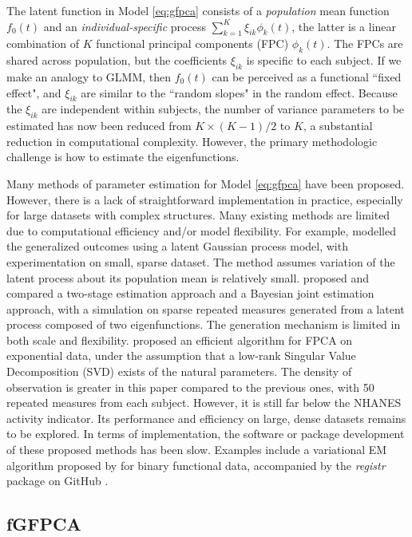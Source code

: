 \documentclass[12pt]{article}
\begin{document}
The latent function in Model \ref{eq:gfpca} consists of a
\textit{population} mean function $f_0(t)$ and an \textit{individual-specific} process $\sum_{k=1}^{K}\xi_{ik}\phi_k(t)$, the latter is a linear combination of $K$ functional principal components (FPC) $\phi_k(t)$. The FPCs are shared across population, but the coefficients $\xi_{ik}$ is specific to each subject. If we make an analogy to GLMM, then $f_0(t)$ can be perceived as a functional ``fixed effect", and $\xi_{ik}$ are similar to the ``random slopes" in the random effect. Because the $\xi_{ik}$ are independent within subjects, the number of variance parameters to be estimated has now been reduced from $K \times (K-1)/2$ to $K$, a substantial reduction in computational complexity. However, the primary methodologic challenge is how to estimate the eigenfunctions.


Many methods of parameter estimation for Model \ref{eq:gfpca}  have been proposed. However, there is a lack of straightforward implementation in practice, especially for large datasets with complex structures. Many existing methods are limited due to computational efficiency and/or model flexibility. For example, \citet{hall2018} modelled the generalized outcomes using a latent Gaussian process model, with experimentation on small, sparse dataset. The method assumes variation of the latent process about its population mean is relatively small. 
\citet{gertheiss2017} proposed and compared a two-stage estimation approach and a Bayesian joint estimation approach, with a simulation on sparse repeated measures generated from a latent process composed of two eigenfunctions. The generation mechanism is limited in both scale and flexibility. \citet{Li2018} proposed an efficient algorithm for FPCA on exponential data, under the assumption that a low-rank Singular Value Decomposition (SVD) exists of the natural parameters. The density of observation is greater in this paper compared to the previous ones, with 50 repeated measures from each subject. However, it is still far below the NHANES activity indicator. Its performance and efficiency on large, dense datasets remains to be explored. In terms of implementation, the software or package development of these proposed methods has been slow. Examples include a variational EM algorithm proposed by \citet{wrobel2019} for binary functional data, accompanied by the \textit{registr} package on GitHub \citep{Wrobel2018}.


\subsection{fGFPCA}
\label{subset:fGFPCA}
\end{document}

